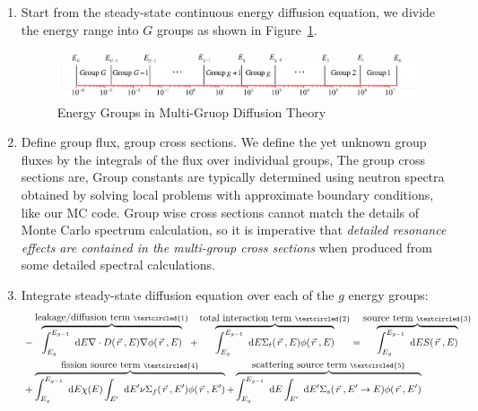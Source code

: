 \documentclass{school-22.211-notes}
\date{March 21, 2012}
\begin{document}
\maketitle

\begin{enumerate}
\item Start from the steady-state continuous energy diffusion equation, we divide the energy range into $G$ groups as shown in Figure~\ref{energy-groups}. 
\begin{figure}[ht]
  \centering
  \includegraphics[width=6in]{images/dfs/energy-group.png}
  \caption{Energy Groups in Multi-Gruop Diffusion Theory} \label{energy-groups}
\end{figure}

\item Define group flux, group cross sections. We define the yet unknown group fluxes by the integrals of the flux over individual groups,
The group cross sections are,
Group constants are typically determined using neutron spectra obtained by solving local problems with approximate boundary conditions, like our MC code. Group wise cross sections cannot match the details of Monte Carlo spectrum calculation, so it is imperative that \textit{detailed resonance effects are contained in the multi-group cross sections} when produced from some detailed spectral calculations. 

\item Integrate steady-state diffusion equation over each of the $g$ energy groups: 
\begin{align}
& - \overbrace{\int_{E_g}^{E_{g-1}} \dE \divergence D(\vecr, E) \gradient \phi(\vecr, E)}^{\mbox{leakage/diffusion term }\textcircled{1}} + 
\overbrace{\int_{E_g}^{E_{g-1}} \dE \Sigma_t(\vecr, E) \phi(\vecr, E)}^{\mbox{total interaction term }\textcircled{2}} = \overbrace{\int_{E_g}^{E_{g-1}} \dE S(\vecr, E)}^{\mbox{source term } \textcircled{3}}  \\
& + \overbrace{\int_{E_g}^{E_{g-1}} \dE \chi(E) \int_{E'} \dE' \nu \Sigma_f (\vecr, E') \phi(\vecr, E')}^{\mbox{fission source term }\textcircled{4}} 
 + \overbrace{\int_{E_g}^{E_{g-1}} \dE \int_{E'} \dE' \Sigma_s(\vecr, E'\to E) \phi(\vecr, E')}^{\mbox{scattering source term }\textcircled{5}} 
\end{align}


\end{enumerate}
\end{document}
